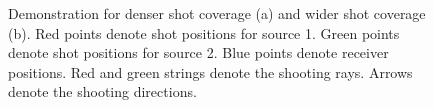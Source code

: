 \begin{figure}[htb!]
  \centering
   \caption{Demonstration for denser shot coverage (a) and wider shot coverage (b). Red points denote shot positions for source 1. Green points denote shot positions for source 2. Blue points denote receiver positions. Red and green strings denote the shooting rays. Arrows denote the shooting directions.} 
   \label{fig:demo1,demo2}%
\end{figure}

